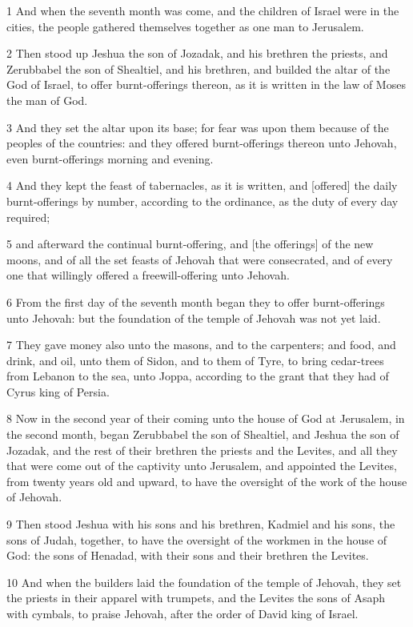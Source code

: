 \par 1 And when the seventh month was come, and the children of Israel were in the cities, the people gathered themselves together as one man to Jerusalem.
\par 2 Then stood up Jeshua the son of Jozadak, and his brethren the priests, and Zerubbabel the son of Shealtiel, and his brethren, and builded the altar of the God of Israel, to offer burnt-offerings thereon, as it is written in the law of Moses the man of God.
\par 3 And they set the altar upon its base; for fear was upon them because of the peoples of the countries: and they offered burnt-offerings thereon unto Jehovah, even burnt-offerings morning and evening.
\par 4 And they kept the feast of tabernacles, as it is written, and [offered] the daily burnt-offerings by number, according to the ordinance, as the duty of every day required;
\par 5 and afterward the continual burnt-offering, and [the offerings] of the new moons, and of all the set feasts of Jehovah that were consecrated, and of every one that willingly offered a freewill-offering unto Jehovah.
\par 6 From the first day of the seventh month began they to offer burnt-offerings unto Jehovah: but the foundation of the temple of Jehovah was not yet laid.
\par 7 They gave money also unto the masons, and to the carpenters; and food, and drink, and oil, unto them of Sidon, and to them of Tyre, to bring cedar-trees from Lebanon to the sea, unto Joppa, according to the grant that they had of Cyrus king of Persia.
\par 8 Now in the second year of their coming unto the house of God at Jerusalem, in the second month, began Zerubbabel the son of Shealtiel, and Jeshua the son of Jozadak, and the rest of their brethren the priests and the Levites, and all they that were come out of the captivity unto Jerusalem, and appointed the Levites, from twenty years old and upward, to have the oversight of the work of the house of Jehovah.
\par 9 Then stood Jeshua with his sons and his brethren, Kadmiel and his sons, the sons of Judah, together, to have the oversight of the workmen in the house of God: the sons of Henadad, with their sons and their brethren the Levites.
\par 10 And when the builders laid the foundation of the temple of Jehovah, they set the priests in their apparel with trumpets, and the Levites the sons of Asaph with cymbals, to praise Jehovah, after the order of David king of Israel.
